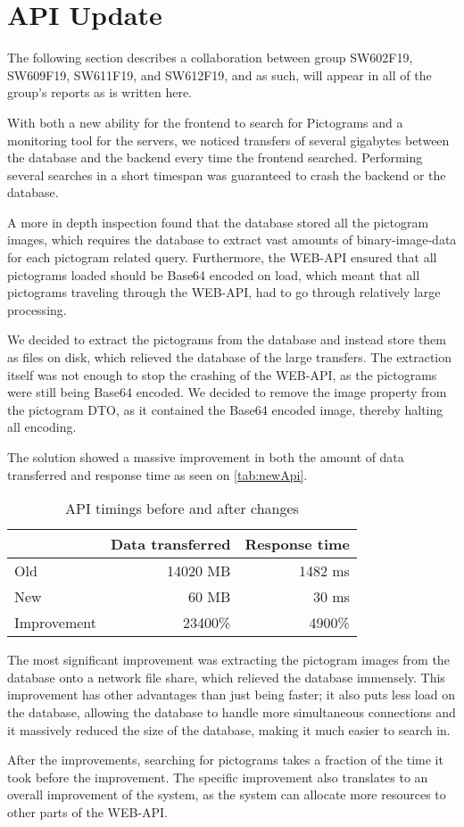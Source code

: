 \section{API Update}\label{CollabAPIUpdate}
The following section describes a collaboration between group SW602F19, SW609F19, SW611F19, and SW612F19, and as such, will appear in all of the group's reports as is written here.

With both a new ability for the frontend to search for Pictograms and a monitoring tool for the servers, we noticed transfers of several gigabytes between the database and the backend every time the frontend searched. 
Performing several searches in a short timespan was guaranteed to crash the backend or the database.

A more in depth inspection found that the database stored all the pictogram images, which requires the database to extract vast amounts of binary-image-data for each pictogram related query. 
Furthermore, the WEB-API ensured that all pictograms loaded should be Base64 encoded on load, which meant that all pictograms traveling through the WEB-API, had to go through relatively large processing.

We decided to extract the pictograms from the database and instead store them as files on disk, which relieved the database of the large transfers. 
The extraction itself was not enough to stop the crashing of the WEB-API, as the pictograms were still being Base64 encoded. 
We decided to remove the image property from the pictogram DTO, as it contained the Base64 encoded image, thereby halting all encoding.

The solution showed a massive improvement in both the amount of data transferred and response time as seen on \autoref{tab:newApi}.

\begin{table}[H]
    \centering
    \begin{tabular}{|l|r|r|}
    \hline
                    & Data transferred  & Response time \\ \hline
        Old         & 14020 MB         & 1482 ms      \\ \hline 
        New         & 60 MB             & 30 ms         \\ \hline
        Improvement & 23400\%          & 4900\%       \\ \hline
    \end{tabular}
    \caption{API timings before and after changes}
    \label{tab:newApi}
\end{table}

The most significant improvement was extracting the pictogram images from the database onto a network file share, which relieved the database immensely. 
This improvement has other advantages than just being faster; it also puts less load on the database, allowing the database to handle more simultaneous connections and it massively reduced the size of the database, making it much easier to search in.

After the improvements, searching for pictograms takes a fraction of the time it took before the improvement. 
The specific improvement also translates to an overall improvement of the system, as the system can allocate more resources to other parts of the WEB-API.
